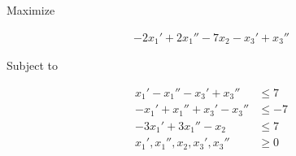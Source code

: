 \documentclass[12pt]{article}
\begin{document}
\begin{enumerate}[1.]
\begin{enumerate}[1.]
\begin{mdframed}
        Maximize

        \begin{align*}
            -2x_1' + 2x_1'' - 7x_2 - x_3' + x_3''
        \end{align*}

        Subject to

        \begin{align*}
            x_1' - x_1'' - x_3' + x_3''  &\leq 7\\
            -x_1' + x_1'' + x_3' - x_3''  &\leq -7\\
            -3x_1' + 3x_1'' - x_2 &\leq 7\\
            x_1', x_1'', x_2, x_3', x_3'' &\geq 0\\
        \end{align*}


        \end{mdframed}
    \end{enumerate}














\end{enumerate}
\end{document}
